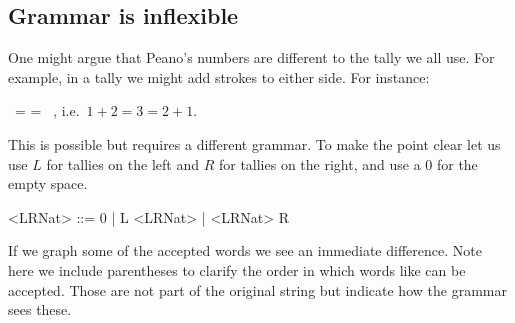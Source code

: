 \subsection{Grammar is inflexible}

One might argue that Peano's numbers are different to the tally we all use.  For example, in a tally we might 
add strokes to either side.  For instance:
\begin{center}
    \StrokeOne~\StrokeTwo = \StrokeThree = \StrokeTwo~\StrokeOne,
    i.e.\ $1+2=3=2+1$.
\end{center}
This is possible but requires a different grammar.  To make the point clear let us 
use $L$ for tallies on the left and $R$ for tallies on the right, and use a $0$ for 
the empty space.
\begin{center}
\begin{Gcode}[]
<LRNat> ::= 0
         | L <LRNat>
         | <LRNat> R
\end{Gcode}
\end{center}
If we graph some of the accepted words we see an immediate difference.
Note here we include parentheses to clarify the order in which 
words like  can be accepted.  Those are not part of the 
original string but indicate how the grammar sees these.
